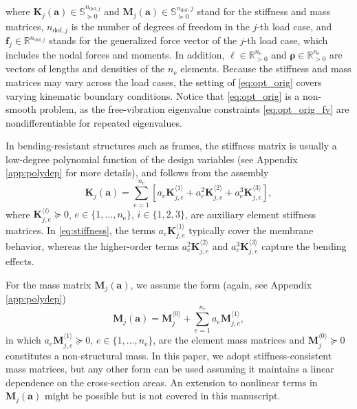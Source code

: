 \documentclass[final,onefignum,onetabnum]{siamart220329}
\begin{document}
where $\mathbf{K}_j(\mathbf{a}) \in \mathbb{S}^{n_{\mathrm{dof},j}}_{\succeq 0}$ and $\mathbf{M}_j(\mathbf{a}) \in \mathbb{S}^{n_\mathrm{dof},j}_{\succeq 0}$ stand for the stiffness and mass matrices, $n_{\mathrm{dof},j}$ is the number of degrees of freedom in the $j$-th load case, and $\mathbf{f}_j \in \mathbb{R}^{n_{\mathrm{dof},j}}$ stands for the generalized force vector of the $j$-th load case, which includes the nodal forces and moments. In addition, $\bm{\ell} \in \mathbb{R}^{n_\mathrm{e}}_{>0}$ and $\bm{\rho} \in \mathbb{R}^{n_\mathrm{e}}_{>0}$ are vectors of lengths and densities of the $n_\mathrm{e}$ elements. {Because the stiffness and mass matrices may vary across the load cases, the setting of \eqref{eq:opt_orig} covers varying kinematic boundary conditions.}     {Notice that \eqref{eq:opt_orig} is a non-smooth problem, as the free-vibration eigenvalue constraints \eqref{eq:opt_orig_fv} are nondifferentiable for repeated eigenvalues.}

In bending-resistant structures such as frames, the stiffness matrix is usually a {low-degree} polynomial function of the design variables {(see Appendix \ref{app:polydep} for more details)}, and follows from the assembly
%
\begin{equation}\label{eq:stiffness}
	\mathbf{K}_j (\mathbf{a}) = \sum_{e=1}^{n_\mathrm{e}} \left[a_e \mathbf{K}_{j,e}^{\langle 1\rangle} + a_e^2 \mathbf{K}_{j,e}^{\langle 2\rangle} + a_e^3 \mathbf{K}_{j,e}^{\langle 3\rangle}\right],
\end{equation}
%
where $\mathbf{K}_{j,e}^{\langle i\rangle} \succeq 0$, $e \in \{1, \dots, n_\mathrm{e}\}$, $i \in \{1,2,3\}$, are auxiliary element stiffness matrices. In \eqref{eq:stiffness}, the terms $ a_e \mathbf{K}_{j,e}^{\langle 1\rangle}$ {typically} cover the membrane behavior, whereas the higher-order terms $a_e^2 \mathbf{K}_{j,e}^{\langle 2\rangle}$ and $a_e^3 \mathbf{K}_{j,e}^{\langle 3\rangle}$ capture the bending effects.

For the mass matrix $\mathbf{M}_j(\mathbf{a})$, we assume the form {(again, see Appendix \ref{app:polydep})}
%
\begin{equation}\label{eq:mass}
	\mathbf{M}_j (\mathbf{a}) = \mathbf{M}_j^{\langle 0\rangle} + \sum_{e=1}^{n_\mathrm{e}} a_e\mathbf{M}_{j,e}^{\langle 1\rangle},
\end{equation}
%
in which $a_e \mathbf{M}_{j,e}^{\langle 1\rangle} \succeq 0$, $e \in \{1, \dots, n_\mathrm{e}\}$, are the element mass matrices and $\mathbf{M}_j^{\langle 0\rangle} \succeq 0$ constitutes a non-structural mass. In this paper, we adopt stiffness-consistent mass matrices, but any other form can be used assuming it maintains a linear dependence on the cross-section areas. An extension to nonlinear terms in $\mathbf{M}_j(\mathbf{a})$ might be possible but is not covered in this manuscript.
\end{document}
